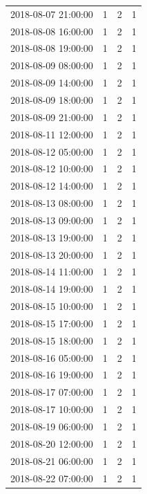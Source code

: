 \begin{tabular}{lrrr}
2018-08-07 21:00:00 & 1 & 2 & 1 \\
2018-08-08 16:00:00 & 1 & 2 & 1 \\
2018-08-08 19:00:00 & 1 & 2 & 1 \\
2018-08-09 08:00:00 & 1 & 2 & 1 \\
2018-08-09 14:00:00 & 1 & 2 & 1 \\
2018-08-09 18:00:00 & 1 & 2 & 1 \\
2018-08-09 21:00:00 & 1 & 2 & 1 \\
2018-08-11 12:00:00 & 1 & 2 & 1 \\
2018-08-12 05:00:00 & 1 & 2 & 1 \\
2018-08-12 10:00:00 & 1 & 2 & 1 \\
2018-08-12 14:00:00 & 1 & 2 & 1 \\
2018-08-13 08:00:00 & 1 & 2 & 1 \\
2018-08-13 09:00:00 & 1 & 2 & 1 \\
2018-08-13 19:00:00 & 1 & 2 & 1 \\
2018-08-13 20:00:00 & 1 & 2 & 1 \\
2018-08-14 11:00:00 & 1 & 2 & 1 \\
2018-08-14 19:00:00 & 1 & 2 & 1 \\
2018-08-15 10:00:00 & 1 & 2 & 1 \\
2018-08-15 17:00:00 & 1 & 2 & 1 \\
2018-08-15 18:00:00 & 1 & 2 & 1 \\
2018-08-16 05:00:00 & 1 & 2 & 1 \\
2018-08-16 19:00:00 & 1 & 2 & 1 \\
2018-08-17 07:00:00 & 1 & 2 & 1 \\
2018-08-17 10:00:00 & 1 & 2 & 1 \\
2018-08-19 06:00:00 & 1 & 2 & 1 \\
2018-08-20 12:00:00 & 1 & 2 & 1 \\
2018-08-21 06:00:00 & 1 & 2 & 1 \\
2018-08-22 07:00:00 & 1 & 2 & 1 \\
\bottomrule
\end{tabular}
